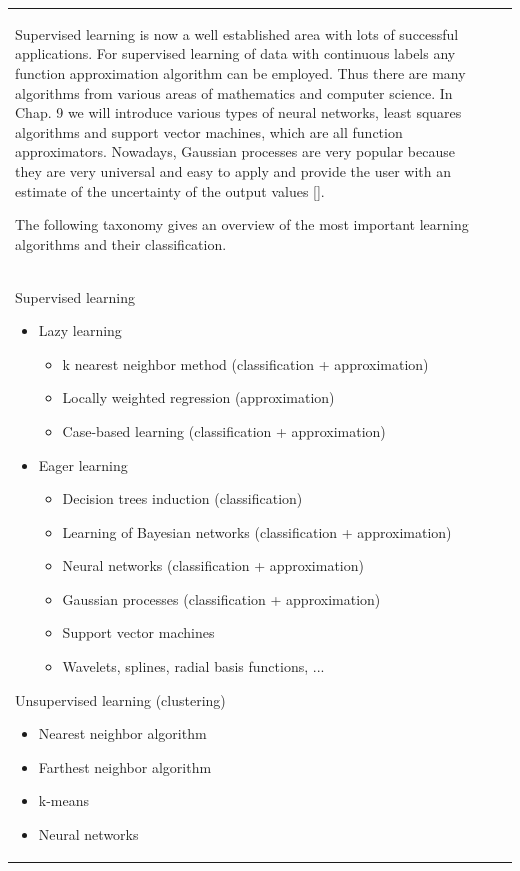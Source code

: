 \documentclass[10pt]{book}
\begin{document}
\begin{center}
\begin{tabular}{|l|l|l|}
Supervised learning is now a well established area with lots of successful applications. For supervised learning of data with continuous labels any function approximation algorithm can be employed. Thus there are many algorithms from various areas of mathematics and computer science. In Chap. 9 we will introduce various types of neural networks, least squares algorithms and support vector machines, which are all function approximators. Nowadays, Gaussian processes are very popular because they are very universal and easy to apply and provide the user with an estimate of the uncertainty of the output values [\cite{rw06}].

The following taxonomy gives an overview of the most important learning algorithms and their classification.\\
Supervised learning

\begin{itemize}
  \item Lazy learning
    \begin{itemize}
      \item k nearest neighbor method (classification + approximation)
      \item Locally weighted regression (approximation)
      \item Case-based learning (classification + approximation)
    \end{itemize}
  \item Eager learning
    \begin{itemize}
      \item Decision trees induction (classification)
      \item Learning of Bayesian networks (classification + approximation)
      \item Neural networks (classification + approximation)
      \item Gaussian processes (classification + approximation)
      \item Support vector machines
      \item Wavelets, splines, radial basis functions, ...
    \end{itemize}
\end{itemize}

Unsupervised learning (clustering)

\begin{itemize}
  \item Nearest neighbor algorithm
  \item Farthest neighbor algorithm
  \item k-means
  \item Neural networks
\end{itemize}


\end{tabular}
\end{center}
\end{document}
